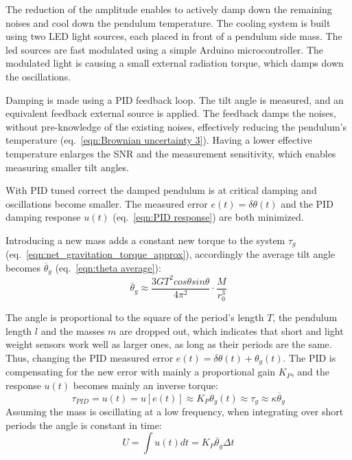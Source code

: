 \documentclass[\main/master.tex]{subfiles}
\begin{document}
\par\noindent
The reduction of the amplitude enables to actively damp down the remaining noises and cool down the pendulum temperature. The cooling system is built using two LED light sources, each placed in front of a pendulum side mass. The led sources are fast modulated using a simple Arduino microcontroller. The modulated light is causing a small external radiation torque, which damps down the oscillations.
\par\noindent
Damping is made using a PID feedback loop. The tilt angle is measured, and an equivalent feedback external source is applied. The feedback damps the noises, without pre-knowledge of the existing noises, effectively reducing the pendulum's temperature (eq.~\ref{eqn:Brownian uncertainty 3}). Having a lower effective temperature enlarges the SNR and the measurement sensitivity, which enables measuring smaller tilt angles.
\par\noindent
With PID tuned correct the damped pendulum is at critical damping and oscillations become smaller. The measured error $e(t) = \delta\theta(t)$ and the PID damping response $u(t)$ (eq.~\ref{eqn:PID response}) are both minimized. 
\par\noindent
Introducing a new mass adds a constant new torque to the system $\tau_g$ (eq.~\ref{eqn:net_gravitation_torque_approx}), accordingly the average tilt angle becomes $\overline{\theta}_g$ (eq.~\ref{eqn:theta average}):
\begin{equation}
\overline{\theta}_g  \approx \frac{3GT^2cos\theta sin\theta}{4\pi^2 } \cdot \frac{M}{r_0^3}   \label{eqn:theta average_2}
\end{equation}
\par\noindent
The angle is proportional to the square of the period's length $T$, the pendulum length $l$ and the masses $m$ are dropped out, which indicates that short and light weight sensors work well as larger ones, as long as their periods are the same. Thus, changing the PID measured error $e(t) = \delta\theta(t) + \theta_g(t)$. The PID is compensating for the new error with mainly a proportional gain $K_P$, and the response $u(t)$ becomes mainly an inverse torque:
\begin{equation}
\tau_{PID} = u(t) = u[e(t)] \approx K_P\theta_g(t) \approx \tau_{g} \approx \kappa \overline{\theta}_g 
\label{eqn:PID_response}
\end{equation}
Assuming the mass is oscillating at a low frequency, when integrating over short periods the angle is constant in time:
\begin{equation}
U = \int u(t) dt = K_P\overline{\theta}_g\Delta t 
\label{eqn:PID_measurement_eqn}
\end{equation}
\end{document}
